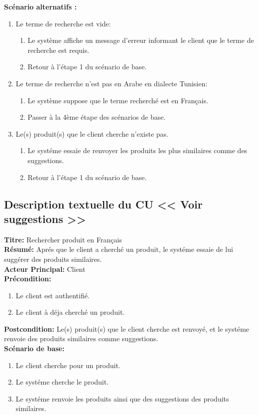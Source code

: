 \textbf{Scénario alternatifs : }
\begin{enumerate}
	\item Le terme de recherche est vide:
	      \begin{enumerate}
		      \item Le système affiche un message d'erreur informant le client que le terme de recherche est requis.
		      \item Retour à l'étape 1 du scénario de base.
	      \end{enumerate}
	\item Le terme de recherche n'est pas en Arabe en dialecte Tunisien:
	      \begin{enumerate}
		      \item Le système suppose que le terme recherché est en Français.
		      \item Passer à la 4ème étape des scénarios de base.
	      \end{enumerate}

	\item Le(s) produit(s) que le client cherche n'existe pas.
	      \begin{enumerate}
		      \item Le systéme essaie de renvoyer les produits les plus similaires comme des suggestions.
		      \item Retour à l'étape 1 du scénario de base.
	      \end{enumerate}
\end{enumerate}

\subsection{Description textuelle du CU << Voir suggestions >>}
\noindent
\textbf{Titre:} Rechercher produit en Français \\
\textbf{Résumé:} Aprés que le client a cherché un produit, le systéme essaie de lui suggérer des produits similaires. \\
\textbf{Acteur Principal:} Client \\
\textbf{Précondition:} \begin{enumerate}
	\item Le client est authentifié.
	\item Le client à déja cherché un produit.
\end{enumerate}
\textbf{Postcondition:} Le(s) produit(s) que le client cherche est renvoyé, et le systéme renvoie des produits similaires comme suggestions. \\
\textbf{Scénario de base: }
\begin{enumerate}
	\item Le client cherche pour un produit.
	\item Le systéme cherche le produit.
	\item Le systéme renvoie les produits ainsi que des suggestions des produits similaires.
\end{enumerate}

